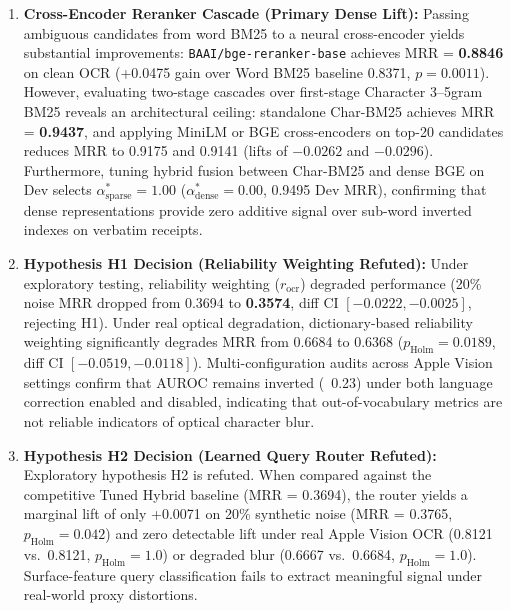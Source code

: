\documentclass[conference]{IEEEtran}
\begin{document}
\begin{enumerate}
    \setlength{\itemsep}{0.2pt plus 0.1pt}
    \setlength{\parskip}{0pt}
    \item \textbf{Cross-Encoder Reranker Cascade (Primary Dense Lift):} Passing ambiguous candidates from word BM25 to a neural cross-encoder yields substantial improvements: \texttt{BAAI/bge-reranker-base} achieves MRR = \textbf{0.8846} on clean OCR (+0.0475 gain over Word BM25 baseline 0.8371, $p = 0.0011$). However, evaluating two-stage cascades over first-stage Character 3--5gram BM25 reveals an architectural ceiling: standalone Char-BM25 achieves MRR = \textbf{0.9437}, and applying MiniLM or BGE cross-encoders on top-20 candidates reduces MRR to 0.9175 and 0.9141 (lifts of $-0.0262$ and $-0.0296$). Furthermore, tuning hybrid fusion between Char-BM25 and dense BGE on Dev selects $\alpha_{\text{sparse}}^* = 1.00$ ($\alpha_{\text{dense}}^* = 0.00$, 0.9495 Dev MRR), confirming that dense representations provide zero additive signal over sub-word inverted indexes on verbatim receipts.
    \item \textbf{Hypothesis H1 Decision (Reliability Weighting Refuted):} Under exploratory testing, reliability weighting ($r_{\text{ocr}}$) degraded performance (20\% noise MRR dropped from 0.3694 to \textbf{0.3574}, diff CI $[-0.0222, -0.0025]$, rejecting H1). Under real optical degradation, dictionary-based reliability weighting significantly degrades MRR from 0.6684 to 0.6368 ($p_{\text{Holm}} = 0.0189$, diff CI $[-0.0519, -0.0118]$). Multi-configuration audits across Apple Vision settings confirm that AUROC remains inverted (~0.23) under both language correction enabled and disabled, indicating that out-of-vocabulary metrics are not reliable indicators of optical character blur.
    \item \textbf{Hypothesis H2 Decision (Learned Query Router Refuted):} Exploratory hypothesis H2 is refuted. When compared against the competitive Tuned Hybrid baseline (MRR = 0.3694), the router yields a marginal lift of only +0.0071 on 20\% synthetic noise (MRR = 0.3765, $p_{\text{Holm}} = 0.042$) and zero detectable lift under real Apple Vision OCR (0.8121 vs.\ 0.8121, $p_{\text{Holm}} = 1.0$) or degraded blur (0.6667 vs.\ 0.6684, $p_{\text{Holm}} = 1.0$). Surface-feature query classification fails to extract meaningful signal under real-world proxy distortions.
\end{enumerate}
\end{document}

